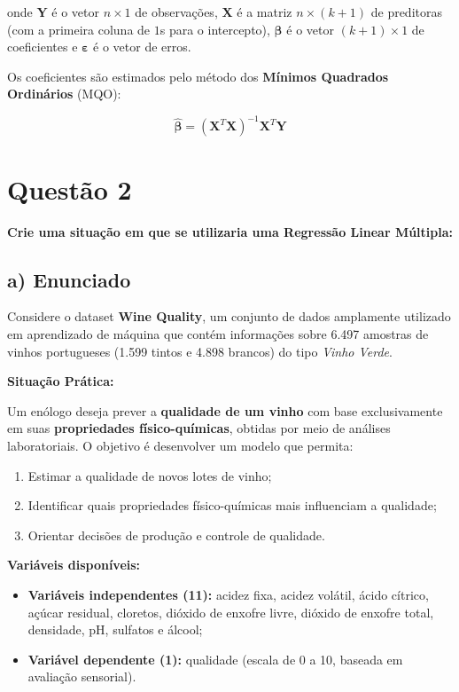 \documentclass[12pt,a4paper]{article}
\begin{document}
\noindent onde $\mathbf{Y}$ é o vetor $n \times 1$ de observações, $\mathbf{X}$ é a matriz $n \times (k+1)$ de preditoras (com a primeira coluna de $1$s para o intercepto), $\boldsymbol{\beta}$ é o vetor $(k+1) \times 1$ de coeficientes e $\boldsymbol{\varepsilon}$ é o vetor de erros.

Os coeficientes são estimados pelo método dos \textbf{Mínimos Quadrados Ordinários} (MQO):

\begin{equation}
\hat{\boldsymbol{\beta}} = (\mathbf{X}^T \mathbf{X})^{-1} \mathbf{X}^T \mathbf{Y}
\end{equation}

\newpage
\section*{Questão 2}
\textbf{Crie uma situação em que se utilizaria uma Regressão Linear Múltipla:}

\subsection*{a) Enunciado}

Considere o dataset \textbf{Wine Quality}, um conjunto de dados amplamente utilizado em aprendizado de máquina que contém informações sobre 6.497 amostras de vinhos portugueses (1.599 tintos e 4.898 brancos) do tipo \textit{Vinho Verde}.

\textbf{Situação Prática:}

Um enólogo deseja prever a \textbf{qualidade de um vinho} com base exclusivamente em suas \textbf{propriedades físico-químicas}, obtidas por meio de análises laboratoriais. O objetivo é desenvolver um modelo que permita:

\begin{enumerate}
  \item Estimar a qualidade de novos lotes de vinho;
  \item Identificar quais propriedades físico-químicas mais influenciam a qualidade;
  \item Orientar decisões de produção e controle de qualidade.
\end{enumerate}

\textbf{Variáveis disponíveis:}

\begin{itemize}
  \item \textbf{Variáveis independentes (11):} acidez fixa, acidez volátil, ácido cítrico, açúcar residual, cloretos, dióxido de enxofre livre, dióxido de enxofre total, densidade, pH, sulfatos e álcool;
  \item \textbf{Variável dependente (1):} qualidade (escala de 0 a 10, baseada em avaliação sensorial).
\end{itemize}
\end{document}

